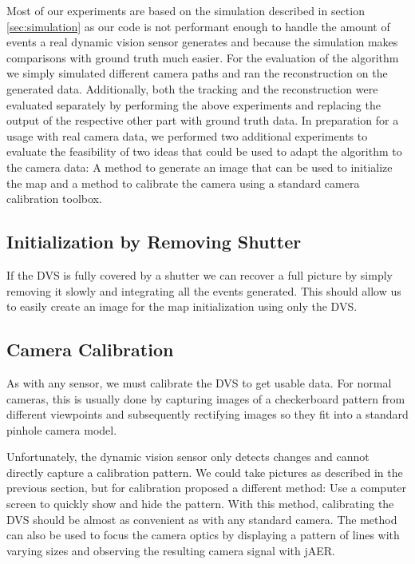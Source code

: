 Most of our experiments are based on the simulation described in section
\ref{sec:simulation} as our code is not performant enough to handle the amount
of events a real dynamic vision sensor generates and because the simulation
makes comparisons with ground truth much easier.
For the evaluation of the algorithm we simply simulated different camera paths
and ran the reconstruction on the generated data.
Additionally, both the tracking and the reconstruction were evaluated separately
by performing the above experiments and replacing the output of the respective
other part with ground truth data.
In preparation for a usage with real camera data, we performed two additional
experiments to evaluate the feasibility of two ideas that could be used to adapt
the algorithm to the camera data:
A method to generate an image that can be used to initialize the map and a method
to calibrate the camera using a standard camera calibration toolbox.

\subsection{Initialization by Removing Shutter}
\label{sec:shutter_removal}
If the DVS is fully covered by a shutter we can recover a full picture by
simply removing it slowly and integrating all the events generated. This should allow
us to easily create an image for the map initialization using only the DVS.

\subsection{Camera Calibration}
\label{sec:camera_calibration}
As with any sensor, we must calibrate the DVS to get usable data. For normal
cameras, this is usually done by capturing images of a checkerboard pattern from
different viewpoints and subsequently rectifying images so they fit into a
standard pinhole camera model.

Unfortunately, the dynamic vision sensor only detects changes and cannot
directly capture a calibration pattern. We could take pictures as described in
the previous section, but for calibration \cite{mueggler2014event} proposed a different method:
Use a computer screen to quickly show and hide the pattern. With this method,
calibrating the DVS should be almost as convenient as with any standard camera.
The method can also be used to focus the camera optics by displaying a pattern
of lines with varying sizes and observing the resulting camera signal with jAER.
